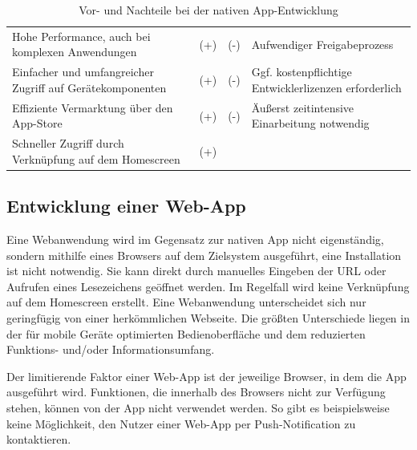 \begin{table}[H]
  \begin{center}\small\renewcommand{\arraystretch}{1.4}\sffamily %
    \begin{tabulary}{\textwidth}{>{\raggedleft}m{61mm} *{2}{>{\ttfamily}m{5mm}} m{61mm}}
    	&	\\ \hline
    
    Hohe Performance, auch bei komplexen Anwendungen & (+) &
    (-) & Aufwendiger Freigabeprozess\\
    
    Einfacher und umfangreicher Zugriff auf Gerätekomponenten & (+) &
    (-) & Ggf. kostenpflichtige Entwicklerlizenzen erforderlich\\
    
    Effiziente Vermarktung über den App-Store & (+) & (-) & Äußerst zeitintensive Einarbeitung notwendig\\
    
    Schneller Zugriff durch Verknüpfung auf dem Homescreen & (+) & & \\

    \end{tabulary}        
    
    \caption{Vor- und Nachteile bei der nativen App-Entwicklung}
    \label{tab:procon-nativ}
  \end{center}
\end{table}

\subsection{Entwicklung einer Web-App}
Eine Webanwendung wird im Gegensatz zur nativen App nicht eigenständig, sondern mithilfe eines Browsers auf dem Zielsystem ausgeführt, eine Installation ist nicht notwendig. Sie kann direkt durch manuelles Eingeben der URL oder Aufrufen eines Lesezeichens geöffnet werden. Im Regelfall wird keine Verknüpfung auf dem Homescreen erstellt. Eine Webanwendung unterscheidet sich nur geringfügig von einer herkömmlichen Webseite. Die größten Unterschiede liegen in der für mobile Geräte optimierten Bedienoberfläche und dem reduzierten Funktions- und/oder Informationsumfang.

Der limitierende Faktor einer Web-App ist der jeweilige Browser, in dem die App ausgeführt wird. Funktionen, die innerhalb des Browsers nicht zur Verfügung stehen, können von der App nicht verwendet werden. So gibt es beispielsweise keine Möglichkeit, den Nutzer einer Web-App per Push-Notification zu kontaktieren. 

